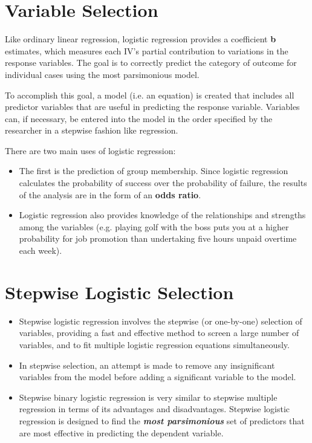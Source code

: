 \documentclass[a4paper,12pt]{article}
\begin{document}
\section*{Variable Selection}
Like ordinary linear regression, logistic regression provides a coefficient \textbf{b} estimates, which measures
each IV's partial contribution to variations in the response variables. The goal is to correctly predict
the category of outcome for individual cases using the most parsimonious model.

\noindent To accomplish this goal, a model (i.e. an equation) is created that includes all predictor variables that are useful in predicting the response variable. Variables can, if necessary, be entered into the model in the order specified by the researcher in a stepwise fashion like regression.


There are two main uses of logistic regression:
\begin{itemize}
	\item The first is the prediction of group membership. Since logistic regression calculates the
	probability of success over the probability of failure, the results of the analysis are in
	the form of an \textbf{odds ratio}.
	\item Logistic regression also provides knowledge of the relationships and strengths among
	the variables (e.g. playing golf with the boss puts you at a higher probability for job
	promotion than undertaking five hours unpaid overtime each week).
\end{itemize}


\section*{Stepwise Logistic Selection}
\begin{itemize}
\item Stepwise logistic regression involves the stepwise (or one-by-one) selection of variables,
	providing a fast and effective method to screen a large number of variables, and to fit
	multiple logistic regression equations simultaneously.
	
\item In stepwise selection, an attempt is made to remove any insignificant variables from the model before adding a significant variable to the model.
	
\item Stepwise binary logistic regression is very similar to stepwise multiple regression in terms of its advantages and disadvantages. Stepwise logistic regression is designed to find the \textbf{\textit{most parsimonious}} set of predictors that are most effective in predicting the dependent variable.
\end{itemize}
\end{document}

